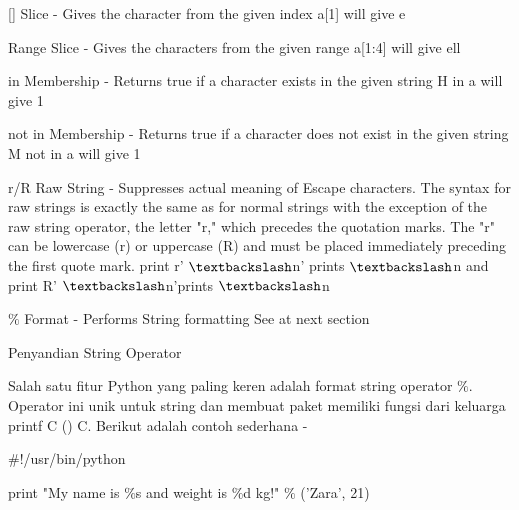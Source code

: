 [] \hspace*{0.5in} Slice - Gives the character from the given index \hspace*{0.5in} a[1] will give e \par
[ : ] \hspace*{0.5in} Range Slice - Gives the characters from the given range \hspace*{0.5in} a[1:4] will give ell \par
in \hspace*{0.5in} Membership - Returns true if a character exists in the given string \hspace*{0.5in} H in a will give 1 \par
not in  \hspace*{0.5in} Membership - Returns true if a character does not exist in the given string \hspace*{0.5in} M not in a will give 1 \par
r/R \hspace*{0.5in} Raw String - Suppresses actual meaning of Escape characters. The syntax for raw strings is exactly the same as for normal strings with the exception of the raw string operator, the letter "r," which precedes the quotation marks. The "r" can be lowercase (r) or uppercase (R) and must be placed immediately preceding the first quote mark. \hspace*{0.5in} print r' $  \textbackslash  $n' prints  $  \textbackslash  $n and print R' $  \textbackslash  $n'prints  $  \textbackslash  $n \par
 $  \%  $ \hspace*{0.5in} Format - Performs String formatting \hspace*{0.5in} See at next section \par
\vspace{12pt}
Penyandian String Operator \par
\vspace{12pt}
Salah satu fitur Python yang paling keren adalah format string operator $  \%  $. Operator ini unik untuk string dan membuat paket memiliki fungsi dari keluarga printf C () C. Berikut adalah contoh sederhana - \par
\vspace{12pt}
 $  \#  $!/usr/bin/python \par
\vspace{12pt}
print "My name is  $  \%  $s and weight is  $  \%  $d kg!"  $  \%  $ ('Zara', 21)  \par
\vspace{12pt}
